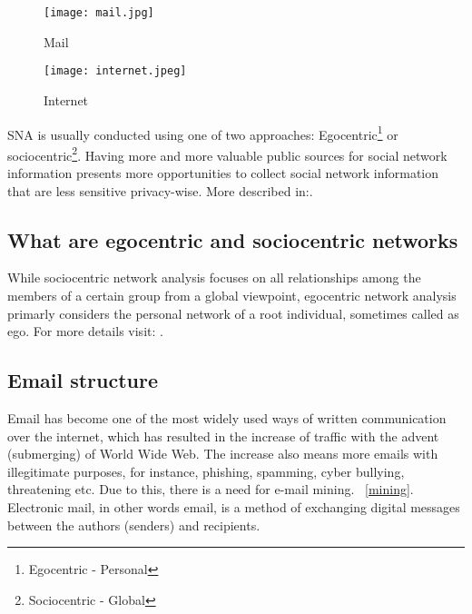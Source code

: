 \documentclass[10pt,twoside,english,a4paper]{article}
\begin{document}
\begin{figure*}[h!]
	\centering
	\begin{subfigure}[b]{0.3\linewidth}
		\texttt{[image: mail.jpg]}
		\caption{Mail}
	\end{subfigure}
	\space                                                
	\begin{subfigure}[b]{0.3\linewidth}
		\texttt{[image: internet.jpeg]}
		\caption{Internet}
	\end{subfigure}
	\label{fig:web}

\end{figure*}
SNA is usually conducted using one of two approaches: Egocentric\footnote{Egocentric - Personal} or sociocentric\footnote{Sociocentric - Global}.  Having more and more valuable public sources for social network information presents more opportunities to collect social network information that are less sensitive privacy-wise. More described in:\cite{IdoGuyPublicvsPrivate}.




\subsection{What are egocentric and sociocentric networks} \label{vysvetlenie}
While sociocentric network analysis focuses on all relationships among the members of a certain group from a global viewpoint, egocentric network analysis primarly considers the personal network of a root individual, sometimes called as ego. 
For more details visit: \cite{IdoGuyPublicvsPrivate}.


\subsection{Email structure} \label{comparison}
Email has become one of the most widely used ways of written communication over the internet, which has resulted in the increase of traffic with the advent (submerging) of World Wide Web. The increase also means more emails with illegitimate purposes, for instance, phishing, spamming, cyber bullying, threatening etc. Due to this, there is a need for e-mail mining. ~\ref{mining}. Electronic mail, in other words email, is a method of exchanging digital messages between the authors (senders) and recipients. 
\end{document}
